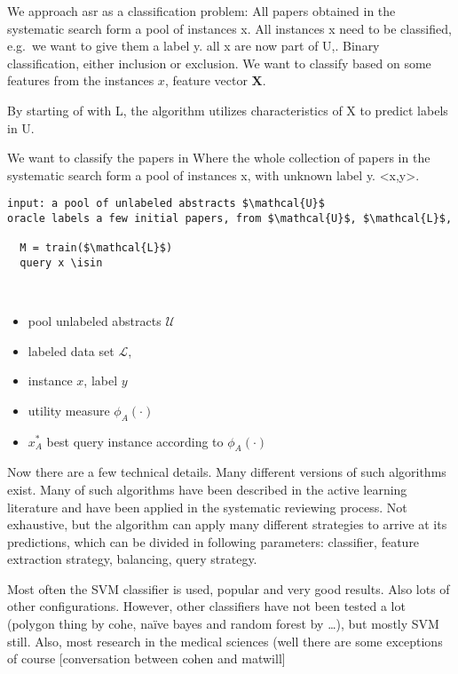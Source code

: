 \documentclass[
]{article}
\begin{document}
We approach asr as a classification problem: All papers obtained in the
systematic search form a pool of instances x. All instances x need to be
classified, e.g.~we want to give them a label y. all x are now part of
U,. Binary classification, either inclusion or exclusion. We want to
classify based on some features from the instances \(x\), feature vector
\(\mathbf{X}\).

By starting of with L, the algorithm utilizes characteristics of X to
predict labels in U.

We want to classify the papers in Where the whole collection of papers
in the systematic search form a pool of instances x, with unknown label
y. \textless x,y\textgreater.

\begin{verbatim}
input: a pool of unlabeled abstracts $\mathcal{U}$ 
oracle labels a few initial papers, from $\mathcal{U}$, $\mathcal{L}$, 
  
  M = train($\mathcal{L}$)
  query x \isin 
  
  
\end{verbatim}

\begin{itemize}
\item
  pool unlabeled abstracts \(\mathcal{U}\)
\item
  labeled data set \(\mathcal{L}\),
\item
  instance \(x\), label \(y\)
\item
  utility measure \(\phi_A(\cdot)\)
\item
  \(x^*_A\) best query instance according to \(\phi_A(\cdot)\)
\end{itemize}

Now there are a few technical details. Many different versions of such
algorithms exist. Many of such algorithms have been described in the
active learning literature and have been applied in the systematic
reviewing process. Not exhaustive, but the algorithm can apply many
different strategies to arrive at its predictions, which can be divided
in following parameters: classifier, feature extraction strategy,
balancing, query strategy.

Most often the SVM classifier is used, popular and very good results.
Also lots of other configurations. However, other classifiers have not
been tested a lot (polygon thing by cohe, naïve bayes and random forest
by \ldots), but mostly SVM still. Also, most research in the medical
sciences (well there are some exceptions of course {[}conversation
between cohen and matwill{]}
\end{document}
